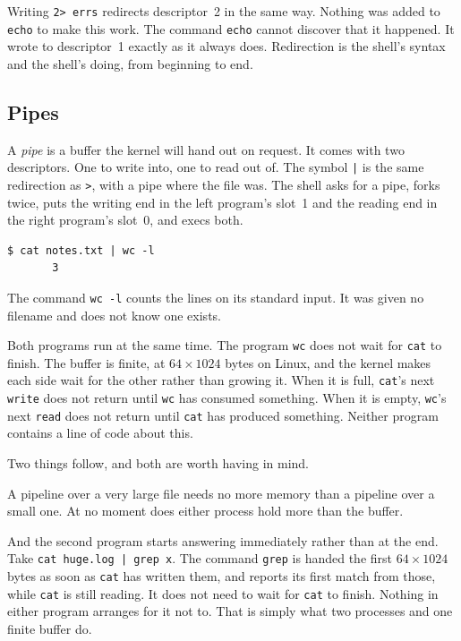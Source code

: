\documentclass[11pt,a4paper]{article}
\begin{document}
Writing \texttt{2> errs} redirects descriptor~2 in the same way. Nothing was added to \texttt{echo} to
make this work. The command \texttt{echo} cannot discover that it happened. It wrote to descriptor~1 exactly as
it always does. Redirection is the shell's syntax and the shell's doing, from beginning to end.

\subsection{Pipes}

A \emph{pipe} is a buffer the kernel will hand out on request. It comes with two descriptors.
One to write into, one to read out of. The symbol \texttt{|} is the same redirection as \texttt{>}, with a pipe
where the file was. The shell asks for a pipe, forks twice, puts the writing end in the left
program's slot~1 and the reading end in the right program's slot~0, and execs both.

\begin{lstlisting}[language=SH]
$ cat notes.txt | wc -l
       3
\end{lstlisting}

The command \texttt{wc -l} counts the lines on its standard input. It was given no filename and does not
know one exists.

Both programs run at the same time. The program \texttt{wc} does not wait for \texttt{cat} to
finish. The
buffer is finite, at $64 \times 1024$ bytes on Linux, and the kernel makes each side wait for the
other rather than growing it. When it is full, \texttt{cat}'s next \texttt{write} does not return
until \texttt{wc} has consumed something. When it is empty, \texttt{wc}'s next \texttt{read} does
not return until \texttt{cat} has produced something. Neither program contains a line of code about
this.

Two things follow, and both are worth having in mind.

A pipeline over a very large file needs no more memory than a pipeline over a small one. At no
moment does either process hold more than the buffer.

And the second program starts answering immediately rather than at the end. Take
\texttt{cat huge.log | grep x}. The command \texttt{grep} is handed the first $64 \times 1024$
bytes as soon as \texttt{cat} has written them, and reports its first match from those, while
\texttt{cat} is still reading. It does not need to wait for \texttt{cat} to finish. Nothing in
either program arranges for it not to. That is simply what two processes and one finite buffer
do.
\end{document}
